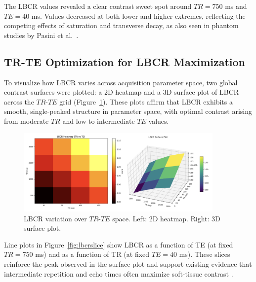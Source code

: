 \documentclass[10pt,a4paper,twoside]{article}
\begin{document}
The LBCR values revealed a clear contrast sweet spot around \( TR = 750 \) ms and \( TE = 40 \) ms. Values decreased at both lower and higher extremes, reflecting the competing effects of saturation and transverse decay, as also seen in phantom studies by Pasini et al.\ \cite{pasini2025}.

\subsection{TR-TE Optimization for LBCR Maximization}

To visualize how LBCR varies across acquisition parameter space, two global contrast surfaces were plotted: a 2D heatmap and a 3D surface plot of LBCR across the \( TR \)-\( TE \) grid (Figure~\ref{fig:lbcrsurface}). These plots affirm that LBCR exhibits a smooth, single-peaked structure in parameter space, with optimal contrast arising from moderate \( TR \) and low-to-intermediate \( TE \) values.

\begin{figure}[htbp!]
\centering
\includegraphics[width=0.9\textwidth]{lbcrsurfaceheatmap.png}
\caption{LBCR variation over \( TR \)-\( TE \) space. Left: 2D heatmap. Right: 3D surface plot.}
\label{fig:lbcrsurface}
\end{figure}

Line plots in Figure~\ref{fig:lbcrslice} show LBCR as a function of TE (at fixed \( TR = 750 \) ms) and as a function of TR (at fixed \( TE = 40 \) ms). These slices reinforce the peak observed in the surface plot and support existing evidence that intermediate repetition and echo times often maximize soft-tissue contrast \cite{naganawa2002, bernstein2004}.
\end{document}
